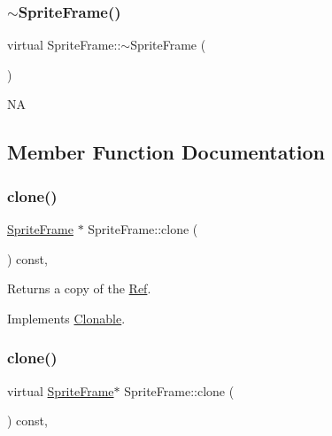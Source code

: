 \subsubsection{\texorpdfstring{$\sim$\+Sprite\+Frame()}{~SpriteFrame()}\hspace{0.1cm}{\footnotesize\ttfamily [2/2]}}
{\footnotesize\ttfamily virtual Sprite\+Frame\+::$\sim$\+Sprite\+Frame (\begin{DoxyParamCaption}{ }\end{DoxyParamCaption})\hspace{0.3cm}{\ttfamily [virtual]}}

NA 

\subsection{Member Function Documentation}
\mbox{\label{classSpriteFrame_ae0b8735c582aa16c0a8996f691745faa}} 
\subsubsection{\texorpdfstring{clone()}{clone()}\hspace{0.1cm}{\footnotesize\ttfamily [1/2]}}
{\footnotesize\ttfamily \hyperlink{classSpriteFrame}{Sprite\+Frame} $\ast$ Sprite\+Frame\+::clone (\begin{DoxyParamCaption}{ }\end{DoxyParamCaption}) const\hspace{0.3cm}{\ttfamily [override]}, {\ttfamily [virtual]}}

Returns a copy of the \hyperlink{classRef}{Ref}. 

Implements \hyperlink{classClonable_a36b05a0fa605f4f269e5884bde7f9e0c}{Clonable}.

\mbox{\label{classSpriteFrame_aaf6270892ebccf210b1823a3d1e1321e}} 
\subsubsection{\texorpdfstring{clone()}{clone()}\hspace{0.1cm}{\footnotesize\ttfamily [2/2]}}
{\footnotesize\ttfamily virtual \hyperlink{classSpriteFrame}{Sprite\+Frame}$\ast$ Sprite\+Frame\+::clone (\begin{DoxyParamCaption}{ }\end{DoxyParamCaption}) const\hspace{0.3cm}{\ttfamily [override]}, {\ttfamily [virtual]}}

